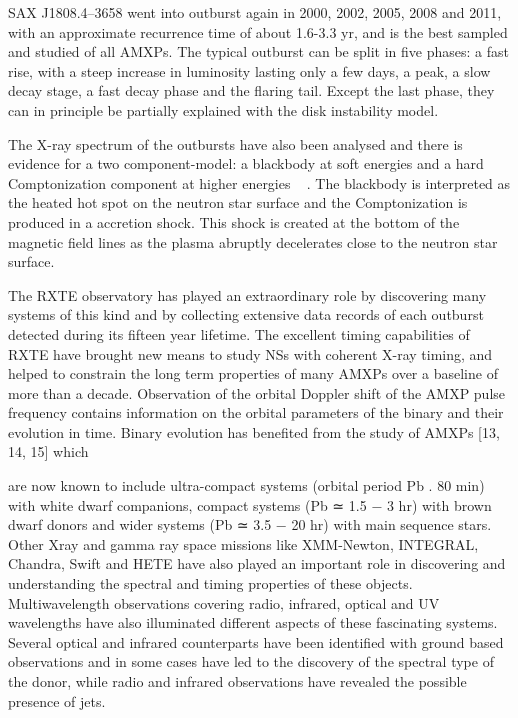 \documentclass{wihuri}
\begin{document}
SAX J1808.4–3658 went into outburst again in 2000, 2002, 2005, 2008 and 2011,
with an approximate recurrence time of about 1.6-3.3 yr, and is the best sampled and
studied of all AMXPs. The typical outburst can be split in five phases: a
fast rise, with a steep increase in luminosity lasting only a few days, a peak, a slow
decay stage, a fast decay phase and the flaring tail. Except the last phase, they can in principle be partially explained with the disk instability model. %


The X-ray spectrum of the outbursts have also been analysed and there is evidence for a two component-model: a blackbody at soft energies and a hard Comptonization component at higher energies ~\cite{twocompmod} %
. The blackbody is interpreted as the heated hot spot on the neutron star surface and the Comptonization is produced in a accretion shock. This shock is created at the bottom of the magnetic field lines as the plasma abruptly decelerates close to the neutron star surface.




\iffalse

The RXTE observatory has played an extraordinary role by discovering many
systems of this kind and by collecting extensive data records of each outburst detected
during its fifteen year lifetime. The excellent timing capabilities of RXTE
have brought new means to study NSs with coherent X-ray timing, and helped to
constrain the long term properties of many AMXPs over a baseline of more than
a decade. Observation of the orbital Doppler shift of the AMXP pulse frequency
contains information on the orbital parameters of the binary and their evolution in
time. Binary evolution has benefited from the study of AMXPs [13, 14, 15] which

are now known to include ultra-compact systems (orbital period Pb . 80 min) with
white dwarf companions, compact systems (Pb ≃ 1.5 − 3 hr) with brown dwarf
donors and wider systems (Pb ≃ 3.5 − 20 hr) with main sequence stars. Other Xray
and gamma ray space missions like XMM-Newton, INTEGRAL, Chandra, Swift
and HETE have also played an important role in discovering and understanding the
spectral and timing properties of these objects. Multiwavelength observations covering
radio, infrared, optical and UV wavelengths have also illuminated different
aspects of these fascinating systems. Several optical and infrared counterparts have
been identified with ground based observations and in some cases have led to the
discovery of the spectral type of the donor, while radio and infrared observations
have revealed the possible presence of jets.
\end{document}
